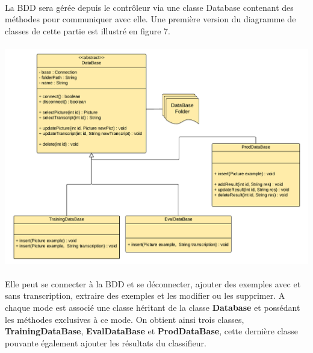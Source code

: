 \paragraph{}

La BDD sera gérée depuis le contrôleur via une classe Database contenant des méthodes pour communiquer avec elle. Une première version du diagramme de classes de cette partie est illustré en figure 7.

\paragraph{}

\begin{mdframed}[frametitle={Figure 8 : Diagramme de classes de l'interface avec la BDD}, innerbottommargin=10]
\begin{center}
\includegraphics[scale=0.5]{bdd.pdf}
\end{center}
\end{mdframed}

\paragraph{}

Elle peut se connecter à la BDD et se déconnecter, ajouter des exemples avec et sans transcription, extraire des exemples et les modifier ou les supprimer. A chaque mode est associé une classe héritant de la classe \textbf{Database} et possédant les méthodes exclusives à ce mode. On obtient ainsi trois classes, \textbf{TrainingDataBase}, \textbf{EvalDataBase} et \textbf{ProdDataBase}, cette dernière classe pouvante également ajouter les résultats du classifieur.

